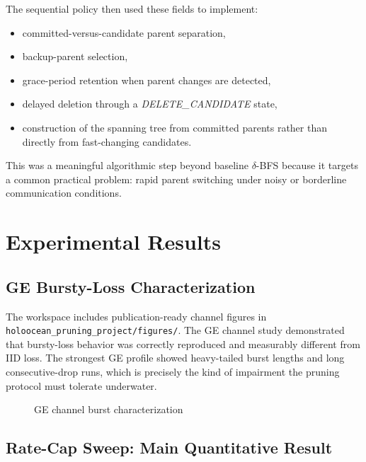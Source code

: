\documentclass[11pt,a4paper]{article}
\begin{document}
The sequential policy then used these fields to implement:
\begin{itemize}
  \item committed-versus-candidate parent separation,
  \item backup-parent selection,
  \item grace-period retention when parent changes are detected,
  \item delayed deletion through a \textit{DELETE\_CANDIDATE} state,
  \item construction of the spanning tree from committed parents rather than directly from fast-changing candidates.
\end{itemize}

This was a meaningful algorithmic step beyond baseline \(\delta\)-BFS because it targets a common practical problem: rapid parent switching under noisy or borderline communication conditions.

\section{Experimental Results}

\subsection{GE Bursty-Loss Characterization}

The workspace includes publication-ready channel figures in \texttt{holoocean\_pruning\_project/figures/}. The GE channel study demonstrated that bursty-loss behavior was correctly reproduced and measurably different from IID loss. The strongest GE profile showed heavy-tailed burst lengths and long consecutive-drop runs, which is precisely the kind of impairment the pruning protocol must tolerate underwater.

\begin{figure}[htbp]
  \centering
  \caption{GE channel burst characterization}
  \label{fig:ge_channel}
\end{figure}

\subsection{Rate-Cap Sweep: Main Quantitative Result}
\end{document}
